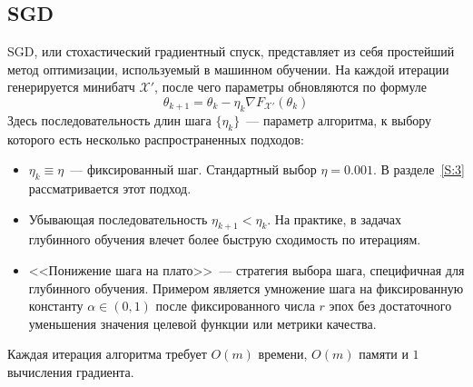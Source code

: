 \documentclass[preprint,12pt]{elsarticle}
\begin{document}
\subsection{SGD}
SGD, или стохастический градиентный спуск, представляет из себя простейший метод оптимизации, используемый в машинном обучении. 
На каждой итерации генерируется минибатч $\mathcal{X}'$, после чего параметры обновляются по формуле
\begin{equation*}
    \theta_{k+1} = \theta_k - \eta_k \nabla F_{\mathcal{X}'} (\theta_k)
\end{equation*}
Здесь последовательность длин шага $\{\eta_k\}$~--- параметр алгоритма, к выбору которого есть несколько распространенных подходов:
\begin{itemize}
    \item $\eta_k \equiv \eta$~--- фиксированный шаг. Стандартный выбор $\eta = 0.001$. В разделе~\ref{S:3} рассматривается этот подход.
    \item Убывающая последовательность $\eta_{k+1} < \eta_k$. На практике, в задачах глубинного обучения влечет более быструю сходимость по итерациям.
    \item <<Понижение шага на плато>>~--- стратегия выбора шага, специфичная для глубинного обучения. Примером является умножение шага на фиксированную константу $\alpha \in (0, 1)$ после фиксированного числа $r$ эпох без достаточного уменьшения значения целевой функции или метрики качества.
\end{itemize}
Каждая итерация алгоритма требует $O(m)$ времени, $O(m)$ памяти и $1$ вычисления градиента.
\end{document}
